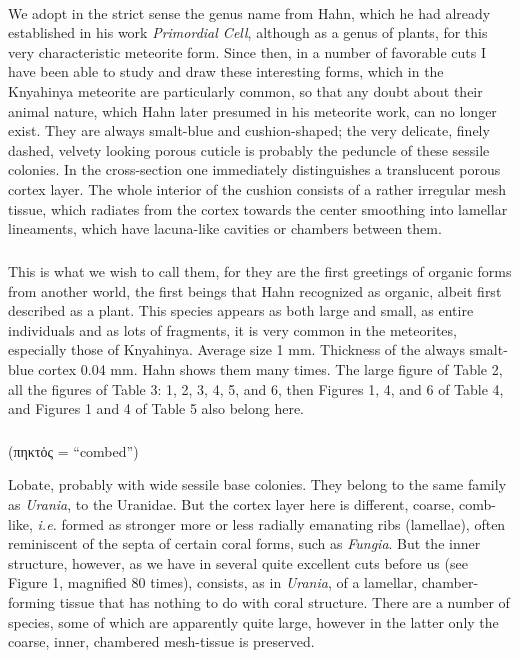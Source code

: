 \documentclass[a4paper, 12pt, oneside]{article}
\begin{document}
\paragraph*{}
We adopt in the strict sense the genus name from Hahn, which he had already established in his work \emph{Primordial Cell}, although as a genus of plants, for this very characteristic meteorite form. Since then, in a number of favorable cuts I have been able to study and draw these interesting forms, which in the Knyahinya meteorite are particularly common, so that any doubt about their animal nature, which Hahn later presumed in his meteorite work, can no longer exist. They are always smalt-blue and cushion-shaped; the very delicate, finely dashed, velvety looking porous cuticle is probably the peduncle of these sessile colonies. In the cross-section one immediately distinguishes a translucent porous cortex layer. The whole interior of the cushion consists of a rather irregular mesh tissue, which radiates from the cortex towards the center smoothing into lamellar lineaments, which have lacuna-like cavities or chambers between them.
\paragraph{\large{}}
\subparagraph{}
This is what we wish to call them, for they are the first greetings of organic forms from another world, the first beings that Hahn recognized as organic, albeit first described as a plant. This species appears as both large and small, as entire individuals and as lots of fragments, it is very common in the meteorites, especially those of Knyahinya. Average size 1 mm. Thickness of the always smalt-blue cortex 0.04 mm. Hahn shows them many times. The large figure of Table 2, all the figures of Table 3: 1, 2, 3, 4, 5, and 6, then Figures 1, 4, and 6 of Table 4, and Figures 1 and 4 of Table 5 also belong here.
\subsubsection{}
\paragraph*{}
(πηκτὁς = ``combed'')%

Lobate, probably with wide sessile base colonies. They belong to the same family as \emph{Urania}, to the Uranidae. But the cortex layer here is different, coarse, comb-like, \emph{i.e.} formed as stronger more or less radially emanating ribs (lamellae), often reminiscent of the septa of certain coral forms, such as \emph{Fungia}. But the inner structure, however, as we have in several quite excellent cuts before us (see Figure 1, magnified 80 times), consists, as in \emph{Urania}, of a lamellar, chamber-forming tissue that has nothing to do with coral structure. There are a number of species, some of which are apparently quite large, however in the latter only the coarse, inner, chambered mesh-tissue is preserved.
\end{document}
